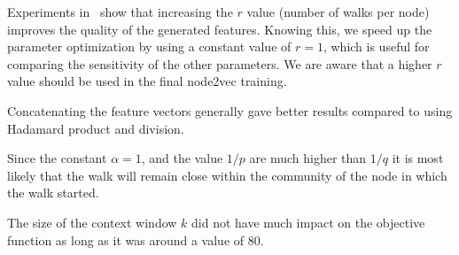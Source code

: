 Experiments in~\cite{node2vec} show that increasing the $r$ value (number of walks per node) improves the quality of the generated features. Knowing this, we speed up the parameter optimization by using a constant value of $r=1$, which is useful for comparing the sensitivity of the other parameters. We are aware that a higher $r$ value should be used in the final node2vec training.

Concatenating the feature vectors generally gave better results compared to using Hadamard product and division.

Since the constant $\alpha = 1$, and the value $1/p$ are much higher than $1/q$ it is most likely that the walk will remain close within the community of the node in which the walk started.

The size of the context window $k$ did not have much impact on the objective function as long as it was around a value of $80$.

